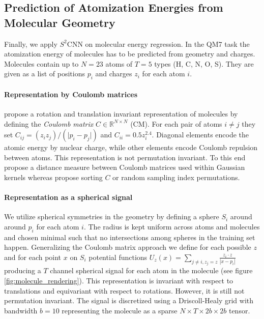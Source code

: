 \documentclass{article} %
\begin{document}
\subsection{Prediction of Atomization Energies from Molecular Geometry}

Finally, we apply $S^2$CNN on molecular energy regression. In the QM7 task \citep{blum2009gdb13,rupp2012qm7} the atomization energy of molecules has to be predicted from geometry and charges. Molecules contain up to $N=23$ atoms of $T=5$ types (H, C, N, O, S). They are given as a list of positions $p_i$  and charges $z_i$ for each atom $i$.

\paragraph{Representation by Coulomb matrices}

\cite{rupp2012qm7} propose a rotation and translation invariant representation of molecules by defining the \textit{Coulomb matrix} $C \in \mathbb{R}^{N\times N}$ (CM). For each pair of atoms $i \neq j$ they set
$C_{ij} = (z_i z_j)/(\lvert p_i - p_j \rvert)$ and $C_{ii} = 0.5 z_i^{2.4}$.
Diagonal elements encode the atomic energy by nuclear charge, while other elements encode Coulomb repulsion between atoms. This representation is not permutation invariant. To this end \cite{rupp2012qm7} propose a distance measure between Coulomb matrices used within Gaussian kernels whereas \cite{montavon2012nips} propose sorting $C$ or random sampling index permutations.

\paragraph{Representation as a spherical signal}

We utilize spherical symmetries in the geometry by defining a sphere $S_i$ around around $p_i$ for each atom $i$.
The radius is kept uniform across atoms and molecules and chosen minimal such that no intersections among spheres in the training set happen.
Generalizing the Coulomb matrix approach we define for each possible $z$ and for each point $x$ on $S_i$ potential functions
$
U_z(x) = \sum_{j\neq i, z_j = z} \frac{z_i \cdot z}{|x - p_i|}
$
producing a $T$ channel spherical signal for each atom in the molecule (see figure \ref{fig:molecule_rendering}).
This representation is invariant with respect to translations and equivariant with respect to rotations.
However, it is still not permutation invariant.
The signal is discretized using a Driscoll-Healy \citep{Driscoll1994} grid with bandwidth $b=10$ representing the molecule as a sparse $N \times T \times 2b \times 2b $ tensor.
\end{document}
